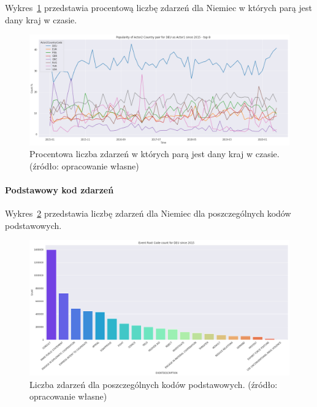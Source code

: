 \documentclass[11pt]{report}
\begin{document}
    Wykres~\ref{fig:DEUpairPerc} przedstawia procentową liczbę zdarzeń dla Niemiec w których parą jest dany kraj w czasie.
    \begin{figure}[!htp]
        \centering
        \includegraphics[width=1 \textwidth]{fig/DEU/DEUactor2PairPercinTIME.png}
        \caption{Procentowa liczba zdarzeń w których parą jest dany kraj w czasie. (źródło: opracowanie własne)}
        \label{fig:DEUpairPerc}
    \end{figure}

    \paragraph{Podstawowy kod zdarzeń}

    Wykres~\ref{fig:DEUPERC} przedstawia liczbę zdarzeń dla Niemiec dla poszczególnych kodów podstawowych.


    \begin{figure}[!htp]
        \centering
        \includegraphics[width=1 \textwidth]{fig/DEU/DEUERC.png}
        \caption{Liczba zdarzeń dla poszczególnych kodów podstawowych. (źródło: opracowanie własne)}
        \label{fig:DEUPERC}
    \end{figure}
\end{document}
